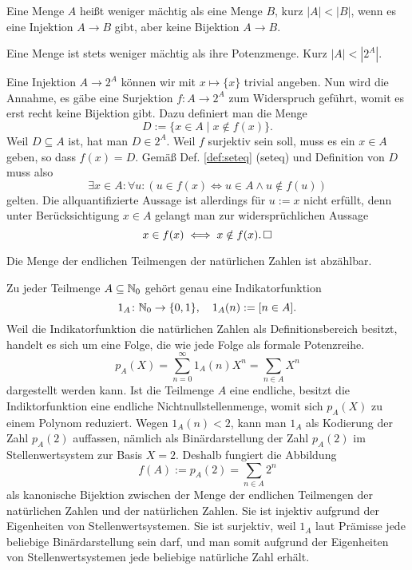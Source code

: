 \begin{Definition}\newlinefirst
Eine Menge $A$ heißt weniger mächtig als eine Menge $B$, kurz
$|A|<|B|$, wenn es eine Injektion $A\to B$ gibt, aber keine
Bijektion $A\to B$.
\end{Definition}

\begin{Satz}\newlinefirst
Eine Menge ist stets weniger mächtig als ihre Potenzmenge. Kurz $|A|<|2^A|$. 
\end{Satz}

\begin{Beweis}
Eine Injektion $A\to 2^A$ können wir mit $x\mapsto\{x\}$ trivial angeben.
Nun wird die Annahme, es gäbe eine Surjektion $f\colon A\to 2^A$
zum Widerspruch geführt, womit es erst recht keine Bijektion gibt.
Dazu definiert man die Menge
\[D := \{x\in A\mid x\notin f(x)\}.\]
Weil $D\subseteq A$ ist, hat man $D\in 2^A$. Weil $f$ surjektiv sein
soll, muss es ein $x\in A$ geben, so dass $f(x) = D$. Gemäß Def.
\ref{def:seteq} (seteq) und Definition von $D$ muss also
\[\exists x\in A\colon \forall u\colon (u\in f(x) \iff u\in A\land u\notin f(u))\]
gelten. Die allquantifizierte Aussage ist allerdings für $u:=x$ nicht erfüllt,
denn unter Berücksichtigung $x\in A$ gelangt man zur widersprüchlichen
Aussage
\[x\in f(x) \iff x\notin f(x).\,\square\]
\end{Beweis}

\begin{Satz}
Die Menge der endlichen Teilmengen der natürlichen Zahlen ist
abzählbar.
\end{Satz}

\begin{Beweis}
Zu jeder Teilmenge $A\subseteq\mathbb N_0$ gehört genau eine Indikatorfunktion
\[1_A\colon\mathbb N_0\to\{0,1\},\quad 1_A(n) := [n\in A].\]
Weil die Indikatorfunktion die natürlichen Zahlen als Definitionsbereich
besitzt, handelt es sich um eine Folge, die wie jede Folge als formale Potenzreihe.
\[p_A(X) = \sum_{n=0}^\infty 1_A(n)X^n = \sum_{n\in A} X^n\]
dargestellt werden kann. Ist die Teilmenge $A$ eine endliche, besitzt
die Indiktorfunktion eine endliche Nichtnullstellenmenge, womit sich
$p_A(X)$ zu einem Polynom reduziert. Wegen $1_A(n)<2$, kann man
$1_A$ als Kodierung der Zahl $p_A(2)$ auffassen, nämlich als Binärdarstellung
der Zahl $p_A(2)$ im Stellenwertsystem zur Basis $X=2$. Deshalb fungiert
die Abbildung
\[f(A) := p_A(2) = \sum_{n\in A} 2^n\]
als kanonische Bijektion zwischen der Menge der endlichen Teilmengen der
natürlichen Zahlen und der natürlichen Zahlen. Sie ist injektiv
aufgrund der Eigenheiten von Stellenwertsystemen. Sie ist surjektiv,
weil $1_A$ laut Prämisse jede beliebige Binärdarstellung sein darf,
und man somit aufgrund der Eigenheiten von Stellenwertsystemen jede
beliebige natürliche Zahl erhält.\,\qedsymbol
\end{Beweis}
